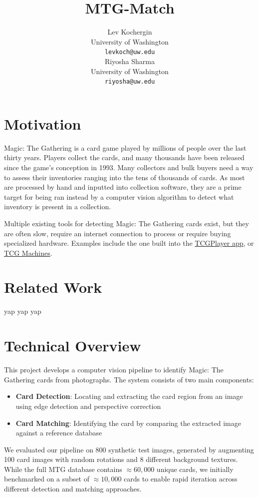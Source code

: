 \documentclass{article} %
\title{MTG-Match}
\author{
Lev Kochergin \\
University of Washington \\
\texttt{levkoch@uw.edu} \\
\And
Riyosha Sharma \\
University of Washington \\
\texttt{riyosha@uw.edu} \\
}
\begin{document}
\maketitle

\section{Motivation}

Magic: The Gathering is a card game played by millions of people over the last thirty years. Players collect the cards, and many thousands have been released since the game's conception in 1993. Many collectors and bulk buyers need a way to assess their inventories ranging into the tens of thousands of cards. As most are processed by hand and inputted into collection software, they are a prime target for being ran instead by a computer vision algorithm to detect what inventory is present in a collection.

Multiple existing tools for detecting Magic: The Gathering cards exist, but they are often slow, require an internet connection to process or require buying specialized hardware. Examples include the one built into the \href{https://apps.apple.com/us/app/tcgplayer/id1247645833}{TCGPlayer app}, or \href{https://tcgmachines.com/product}{TCG Machines}.

\section{Related Work}
yap yap yap

\section{Technical Overview}

This project develops a computer vision pipeline to identify Magic: The Gathering cards from photographs. The system 
consists of two main components:

\begin{itemize}
\item \textbf{Card Detection}: Locating and extracting the card region from an image using edge detection and perspective correction
\item \textbf{Card Matching}: Identifying the card by comparing the extracted image against a reference database
\end{itemize}

We evaluated our pipeline on 800 synthetic test images, generated by augmenting 100 card images with random rotations 
and 8 different background textures. While the full MTG database contains $\approx 60,000$ unique cards, we initially benchmarked 
on a subset of $\approx 10,000$ cards to enable rapid iteration across different detection and matching approaches.
\end{document}
